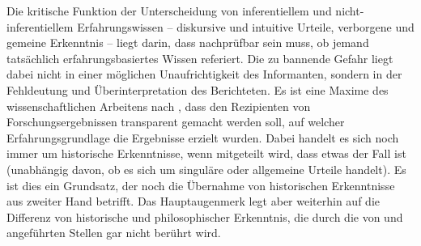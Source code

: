 Die kritische Funktion der Unterscheidung von inferentiellem und
nicht-inferentiellem Erfahrungswissen -- diskursive und intuitive Urteile,
verborgene und gemeine Erkenntnis -- liegt darin, dass nachprüfbar sein muss, ob
jemand tatsächlich erfahrungsbasiertes Wissen referiert. Die zu bannende Gefahr
liegt dabei nicht in einer möglichen Unaufrichtigkeit des Informanten, sondern
in der Fehldeutung und Überinterpretation des Berichteten. Es ist eine Maxime
des wissenschaftlichen Arbeitens nach
, dass den
Rezipienten von Forschungsergebnissen transparent gemacht werden soll, auf
welcher Erfahrungsgrundlage die Ergebnisse erzielt wurden. Dabei handelt es sich
noch immer um historische Erkenntnisse, wenn mitgeteilt wird, dass etwas der
Fall ist (unabhängig davon, ob es sich um singuläre oder allgemeine Urteile
handelt). Es ist dies ein Grundsatz, der noch die Übernahme von historischen
Erkenntnisse aus zweiter Hand betrifft. Das Hauptaugenmerk legt
 aber
weiterhin auf die Differenz von historische und philosophischer Erkenntnis, die
durch die von  und
 angeführten Stellen gar nicht
berührt wird.


